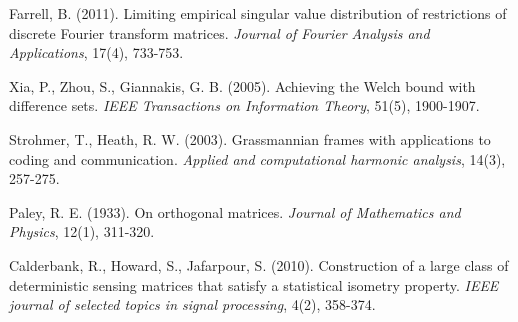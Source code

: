 \documentclass[a4paper,12pt]{article}
\begin{document}
\begin{thebibliography}{1}

 Farrell, B. (2011). Limiting empirical singular value distribution of restrictions of discrete Fourier transform matrices. \emph{Journal of Fourier Analysis and Applications}, 17(4), 733-753.





Xia, P., Zhou, S., Giannakis, G. B. (2005). Achieving the Welch bound with difference sets. \emph{IEEE Transactions on Information Theory}, 51(5), 1900-1907.


Strohmer, T., Heath, R. W. (2003). Grassmannian frames with applications to coding and communication. \emph{Applied and computational harmonic analysis}, 14(3), 257-275.


Paley, R. E. (1933). On orthogonal matrices. \emph{Journal of Mathematics and Physics}, 12(1), 311-320.


Calderbank, R., Howard, S., Jafarpour, S. (2010). Construction of a large class of deterministic sensing matrices that satisfy a statistical isometry property. \emph{IEEE journal of selected topics in signal processing}, 4(2), 358-374.


\end{thebibliography}
\end{document}
